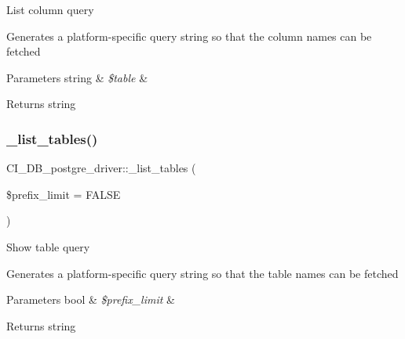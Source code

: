 List column query

Generates a platform-\/specific query string so that the column names can be fetched


\begin{DoxyParams}[1]{Parameters}
string & {\em \$table} & \\
\hline
\end{DoxyParams}
\begin{DoxyReturn}{Returns}
string 
\end{DoxyReturn}
\mbox{\label{class_c_i___d_b__postgre__driver_a1eb267c295f87718c28932be2a54ace1}} 
\subsubsection{\texorpdfstring{\+\_\+list\+\_\+tables()}{\_list\_tables()}}
{\footnotesize\ttfamily C\+I\+\_\+\+D\+B\+\_\+postgre\+\_\+driver\+::\+\_\+list\+\_\+tables (\begin{DoxyParamCaption}\item[{}]{\$prefix\+\_\+limit = {\ttfamily FALSE} }\end{DoxyParamCaption})\hspace{0.3cm}{\ttfamily [protected]}}

Show table query

Generates a platform-\/specific query string so that the table names can be fetched


\begin{DoxyParams}[1]{Parameters}
bool & {\em \$prefix\+\_\+limit} & \\
\hline
\end{DoxyParams}
\begin{DoxyReturn}{Returns}
string 
\end{DoxyReturn}
\mbox{\label{class_c_i___d_b__postgre__driver_abef4ebd91949b1b902b10deba9c30733}} 
